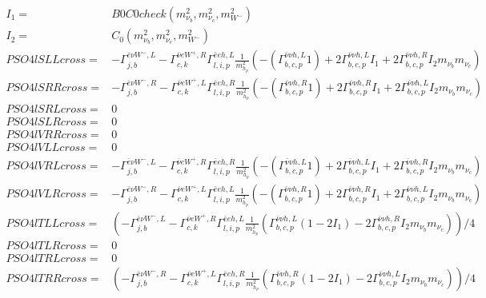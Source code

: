 \documentclass[A4,landscape]{article}
\begin{document}
\begin{align} 
I_1= & B0C0check(m^2_{\nu_{{b}}}, m^2_{\nu_{{c}}}, m^2_{W^-}) \\ 
I_2= & C_0(m^2_{\nu_{{b}}}, m^2_{\nu_{{c}}}, m^2_{W^-}) \\ 
  PSO4lSLLcross= &  - \Gamma^{\bar{e}\nu W^- ,L} _{j, b} - \Gamma^{\bar{\nu}e W^+,R} _{c, k} \Gamma^{\bar{e}e h ,L}_{l, i, p} \frac{1}{m^2_{h_{{p}}}} (-(\Gamma^{\bar{\nu}\nu h ,L}_{b, c, p} 1) + 2 \Gamma^{\bar{\nu}\nu h ,L}_{b, c, p} I_1 + 2 \Gamma^{\bar{\nu}\nu h ,R}_{b, c, p} I_2 m_{\nu_{{b}}} m_{\nu_{{c}}}) \\ 
  PSO4lSRRcross= &  - \Gamma^{\bar{e}\nu W^- ,R} _{j, b} - \Gamma^{\bar{\nu}e W^+,L} _{c, k} \Gamma^{\bar{e}e h ,R}_{l, i, p} \frac{1}{m^2_{h_{{p}}}} (-(\Gamma^{\bar{\nu}\nu h ,R}_{b, c, p} 1) + 2 \Gamma^{\bar{\nu}\nu h ,R}_{b, c, p} I_1 + 2 \Gamma^{\bar{\nu}\nu h ,L}_{b, c, p} I_2 m_{\nu_{{b}}} m_{\nu_{{c}}}) \\ 
  PSO4lSRLcross= & 0 \\ 
  PSO4lSLRcross= & 0 \\ 
  PSO4lVRRcross= & 0 \\ 
  PSO4lVLLcross= & 0 \\ 
  PSO4lVRLcross= &  - \Gamma^{\bar{e}\nu W^- ,L} _{j, b} - \Gamma^{\bar{\nu}e W^+,R} _{c, k} \Gamma^{\bar{e}e h ,R}_{l, i, p} \frac{1}{m^2_{h_{{p}}}} (-(\Gamma^{\bar{\nu}\nu h ,L}_{b, c, p} 1) + 2 \Gamma^{\bar{\nu}\nu h ,L}_{b, c, p} I_1 + 2 \Gamma^{\bar{\nu}\nu h ,R}_{b, c, p} I_2 m_{\nu_{{b}}} m_{\nu_{{c}}}) \\ 
  PSO4lVLRcross= &  - \Gamma^{\bar{e}\nu W^- ,R} _{j, b} - \Gamma^{\bar{\nu}e W^+,L} _{c, k} \Gamma^{\bar{e}e h ,L}_{l, i, p} \frac{1}{m^2_{h_{{p}}}} (-(\Gamma^{\bar{\nu}\nu h ,R}_{b, c, p} 1) + 2 \Gamma^{\bar{\nu}\nu h ,R}_{b, c, p} I_1 + 2 \Gamma^{\bar{\nu}\nu h ,L}_{b, c, p} I_2 m_{\nu_{{b}}} m_{\nu_{{c}}}) \\ 
  PSO4lTLLcross= & ( - \Gamma^{\bar{e}\nu W^- ,L} _{j, b} - \Gamma^{\bar{\nu}e W^+,R} _{c, k} \Gamma^{\bar{e}e h ,L}_{l, i, p} \frac{1}{m^2_{h_{{p}}}} (\Gamma^{\bar{\nu}\nu h ,L}_{b, c, p} (1 - 2 I_1) - 2 \Gamma^{\bar{\nu}\nu h ,R}_{b, c, p} I_2 m_{\nu_{{b}}} m_{\nu_{{c}}}))/4 \\ 
  PSO4lTLRcross= & 0 \\ 
  PSO4lTRLcross= & 0 \\ 
  PSO4lTRRcross= & ( - \Gamma^{\bar{e}\nu W^- ,R} _{j, b} - \Gamma^{\bar{\nu}e W^+,L} _{c, k} \Gamma^{\bar{e}e h ,R}_{l, i, p} \frac{1}{m^2_{h_{{p}}}} (\Gamma^{\bar{\nu}\nu h ,R}_{b, c, p} (1 - 2 I_1) - 2 \Gamma^{\bar{\nu}\nu h ,L}_{b, c, p} I_2 m_{\nu_{{b}}} m_{\nu_{{c}}}))/4 \\ 
\end{align} 
\end{document}
